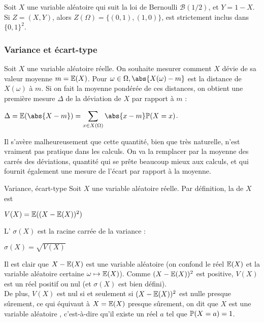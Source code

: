 \documentclass[12pt,a4paper]{report}
\begin{document}
\begin{exemple}{}
Soit $X$ une variable aléatoire qui suit la loi de Bernoulli $\mathcal{B}(1/2)$, et $Y = 1-X$. \\

Si $Z = (X,Y)$, alors $Z(\Omega) = \{(0,1),(1,0)\}$, est strictement inclus dans $\{0,1\}^2$.
\end{exemple}

\subsubsection{Variance et écart-type}

Soit $X$ une variable aléatoire réelle. On souhaite mesurer comment $X$ dévie de sa valeur moyenne $m = \mathbb{E}(X)$. Pour $\omega \in \Omega, \abs{X(\omega)-m}$ est la distance de $X(\omega)$ à $m$. Si on fait la moyenne pondérée de ces distances, on obtient une première mesure $\Delta$ de la déviation de $X$ par rapport à $m$ :
\begin{center}
$\Delta = \E(\abs{X-m}) = \displaystyle \sum_{x \in X(\Omega)} \abs{x-m} \p(X=x)$.
\end{center}

Il s'avère malheureusement que cette quantité, bien que très naturelle, n'est vraiment pas pratique dans les calculs. On va la remplacer par la moyenne des carrés des déviations, quantité qui se prête beaucoup mieux aux calculs, et qui fournit également une mesure de l'écart par rapport à la moyenne.

\pagebreak

\begin{definition}{Variance, écart-type}{}
Soit $X$ une variable aléatoire réelle. Par définition, la  de $X$ est 
\begin{center}
$V(X) = \mathbb{E}((X-\mathbb{E}(X))^2)$
\end{center}

L' $\sigma(X)$ est la racine carrée de la variance : 
\begin{center}
$\sigma(X) = \sqrt{V(X)}$
\end{center}
\end{definition}

\begin{remarque}{}
Il est clair que $X-\mathbb{E}(X)$ est une variable aléatoire (on confond le réel $\mathbb{E}(X)$ et la variable aléatoire certaine $\omega \mapsto \mathbb{E}(X)$). Comme $(X-\mathbb{E}(X))^2$ est positive, $V(X)$ est un réel positif ou nul (et $\sigma(X)$ est bien défini). \\
De plus, $V(X)$ est nul si et seulement si $(X-\mathbb{E}(X))^2$ est nulle presque sûrement, ce qui équivaut à $X = \mathbb{E}(X)$ presque sûrement, on dit que $X$ est une variable aléatoire , c'est-à-dire qu'il existe un réel $a$ tel que $\mathbb{P}(X=a) = 1$.
\end{remarque}
\end{document}
